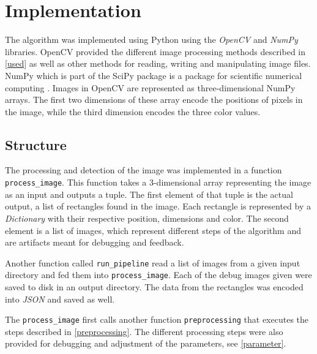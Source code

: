 \section{Implementation}


The algorithm was implemented using Python using the \textit{OpenCV} and
\textit{NumPy} libraries. OpenCV provided the different image processing methods
described in \ref{used} as well as other methods for reading, writing
and manipulating image files. NumPy which is part of the SciPy package is a
package for scientific numerical computing \cite{scipy}. Images in OpenCV are
represented as three-dimensional NumPy arrays. The first two dimensions of these
array encode the positions of pixels in the image, while the third dimension
encodes the three color values.

%
%
%

\subsection{Structure}

The processing and detection of the image was implemented in a function
\texttt{process\_image}. This function takes a 3-dimensional array representing
the image as an input and outputs a tuple. The first element of that tuple is
the actual output, a list of rectangles found in the image. Each rectangle is
represented by a \textit{Dictionary} with their respective position, dimensions
and color. The second element is a list of images, which represent different steps
of the algorithm and are artifacts meant for debugging and feedback.

Another function called \texttt{run\_pipeline} read a list of images from a
given input directory and fed them into \texttt{process\_image}. Each of the
debug images given were saved to disk in an output directory. The data from the
rectangles was encoded into \textit{JSON} and saved as well.

The \texttt{process\_image} first calls another function \texttt{preprocessing}
that executes the steps described in \ref{preprocessing}. The different
processing steps were also provided for debugging and adjustment of the
parameters, see \ref{parameter}.

